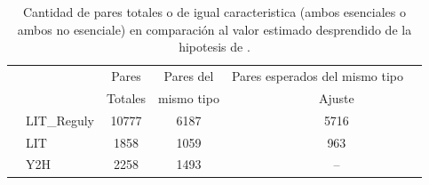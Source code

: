 \begin{table}[!ht]
    \centering
    \caption{\label{tab:pairs} Cantidad de pares totales o de igual caracteristica (ambos esenciales o ambos no esenciale)
    en comparaci\'on al valor estimado desprendido de la hipotesis de \citet{he2006}.}
    {\scriptsize
    \begin{tabularx}{.9\columnwidth}{XlccccX}
        \hline\hline
        &               & Pares   & Pares del   & \multicolumn{2}{c}{Pares esperados del mismo tipo }             \\ 
        \cline{5-6}
        &               & Totales & mismo tipo  &  &        Ajuste         &      \\
        \hline
        & LIT\_Reguly   & 10777   & 6187        &  &         5716          &               \\
        & LIT           & 1858    & 1059        &  &          963          &               \\
        & Y2H           & 2258    & 1493        &  &          --           &               \\
        \hline\hline
    \end{tabularx}
    }
\end{table}
